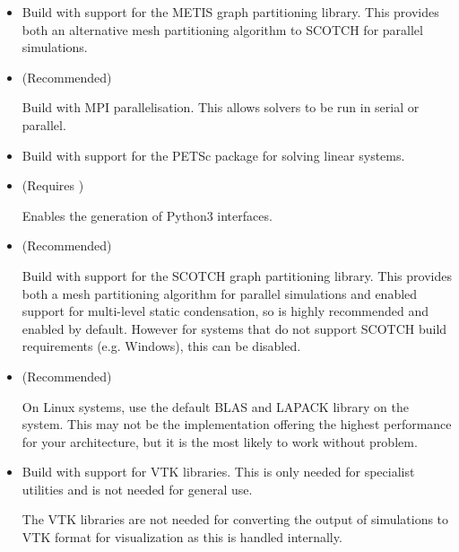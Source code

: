 \begin{itemize}
    \item {}

    Build \nekpp with support for the METIS graph partitioning library. This
    provides both an alternative mesh partitioning algorithm to SCOTCH for
    parallel simulations.

    \item {} (Recommended)

    Build \nekpp with MPI parallelisation. This allows solvers to be run in
    serial or parallel.

    \item {}

    Build \nekpp with support for the PETSc package for solving linear systems.

    \item {} (Requires )
    
    Enables the generation of Python3 interfaces.
    
    \item {} (Recommended)

    Build \nekpp with support for the SCOTCH graph partitioning library. This
    provides both a mesh partitioning algorithm for parallel simulations and
    enabled support for multi-level static condensation, so is highly
    recommended and enabled by default. However for systems that do not support
    SCOTCH build requirements (e.g. Windows), this can be disabled.

    \item {} (Recommended)

    On Linux systems, use the default BLAS and LAPACK library on the system.
    This may not be the implementation offering the highest performance for your
    architecture, but it is the most likely to work without problem.

    \item {}

    Build \nekpp with support for VTK libraries. This is only needed for
    specialist utilities and is not needed for general use.

    \begin{notebox}
    The VTK libraries are not needed for converting the output of simulations to
    VTK format for visualization as this is handled internally.
    \end{notebox}
\end{itemize}

